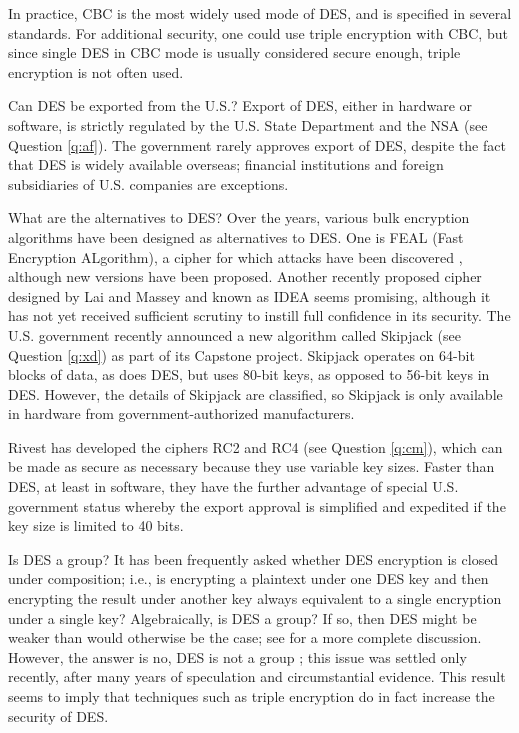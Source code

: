 In practice, CBC is the most widely used mode of DES, and is specified in 
several standards. For additional security, one could use triple encryption 
with CBC, but since single DES in CBC mode is usually considered secure 
enough, triple encryption is not often used.

{Can DES be exported from the U.S.?}
Export of DES, either in hardware or software, 
is strictly regulated by the U.S. State Department and the NSA (see Question 
\ref{q:af}). The government rarely approves export of DES, despite the fact 
that DES is widely available overseas; financial institutions and foreign 
subsidiaries of U.S. companies are exceptions. 

{What are the alternatives to DES?}
Over the years, various bulk encryption algorithms have been designed as 
alternatives to DES. One is FEAL (Fast Encryption ALgorithm), a cipher for 
which attacks have been discovered \cite{biham-shamir-book}, although new 
versions have been proposed. Another recently proposed cipher designed 
by Lai and Massey \cite{lai-massey1} and known as IDEA seems promising, 
although it has not yet received sufficient scrutiny to instill full 
confidence in its security. The U.S. government recently announced a new 
algorithm called Skipjack (see Question \ref{q:xd}) as part of its Capstone 
project. Skipjack operates on 64-bit blocks of data, as does DES, but uses 
80-bit keys, as opposed to 56-bit keys in DES. However, the details of 
Skipjack are classified, so Skipjack is only available in hardware from 
government-authorized manufacturers.

Rivest has developed the ciphers RC2 and RC4 (see Question \ref{q:cm}),
which can be made as secure as necessary because they use variable key sizes.
Faster than DES, at least in software, they have the further advantage of 
special U.S. government status whereby the export approval is simplified 
and expedited if the key size is limited to 40 bits. 

{Is DES a group?}
It has been frequently asked whether DES encryption is closed under
composition; i.e., is encrypting a plaintext under one DES key and
then encrypting the result under another key always equivalent to a 
single encryption under a single key? Algebraically, is DES a group?
If so, then DES might be weaker than would otherwise be the case; see 
\cite{kaliski-des-group} for a more complete discussion. However, the 
answer is no, DES is not a group \cite{campbell}; this issue was settled 
only recently, after many years of speculation and circumstantial evidence. 
This result seems to imply that techniques such as triple encryption do 
in fact increase the security of DES.


